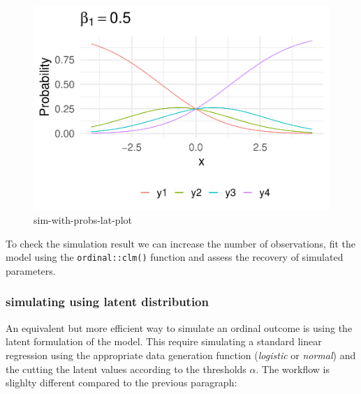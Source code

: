 \documentclass[
  man,floatsintext]{apa6}
\begin{document}
\begin{figure}

{\centering \includegraphics{paper-new_files/figure-latex/sim-with-probs-lat-plot-1} 

}

\caption{sim-with-probs-lat-plot}\label{fig:sim-with-probs-lat-plot}
\end{figure}

To check the simulation result we can increase the number of observations, fit the model using the \texttt{ordinal::clm()} function and assess the recovery of simulated parameters.

\subsubsection{simulating using latent distribution}\label{simulating-using-latent-distribution}

An equivalent but more efficient way to simulate an ordinal outcome is using the latent formulation of the model. This require simulating a standard linear regression using the appropriate data generation function (\emph{logistic} or \emph{normal}) and the cutting the latent values according to the thresholds \(\alpha\). The workflow is slighlty different compared to the previous paragraph:
\end{document}

